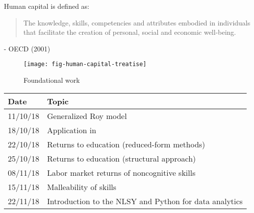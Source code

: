 \begin{frame}
Human capital is defined as:
\vspace{\baselineskip}

\begin{quote}
The knowledge, skills, competencies and attributes embodied in individuals that facilitate
the creation of personal, social and economic well-being.
\end{quote}\vspace{-0.5pt} \hspace{6cm} - OECD (2001)
\end{frame}

\begin{frame}
	\begin{figure}
		\caption{Foundational work}
		\centering\texttt{[image: fig-human-capital-treatise]}
	\end{figure}
\end{frame}
\begin{frame}
\centering
\begin{threeparttable}\footnotesize
  \caption{Lecture plan}
  \begin{tabular}{ll}\toprule
  Date & Topic \\\midrule
   11/10/18  & Generalized Roy model                                 \\
   18/10/18  & Application in \cite{Carneiro.2011}                              \\
   22/10/18  & Returns to education (reduced-form methods) \\
   25/10/18  & Returns to education (structural approach)   \\
   08/11/18  & Labor market returns of noncognitive skills \\
   15/11/18  & Malleability of skills                         \\
   22/11/18  & Introduction to the NLSY and Python for data analytics \\
\bottomrule
\end{tabular}
\end{threeparttable}
\end{frame}

